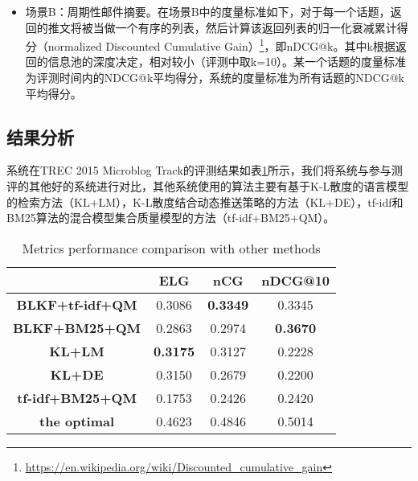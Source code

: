 \begin{itemize}
  \item 场景B：周期性邮件摘要。在场景B中的度量标准如下，对于每一个话题，返回的推文将被当做一个有序的列表，然后计算该返回列表的归一化衰减累计得分（normalized Discounted Cumulative Gain）\footnote{\url{https://en.wikipedia.org/wiki/Discounted_cumulative_gain}}，即nDCG@k。其中k根据返回的信息池的深度决定，相对较小（评测中取k=10）。某一个话题的度量标准为评测时间内的NDCG@k平均得分，系统的度量标准为所有话题的NDCG@k平均得分。
\end{itemize}

\subsection{结果分析}
\label{subsec2:res}
系统在TREC 2015 Microblog Track的评测结果如表\ref{tab:trecRes}所示，我们将系统与参与测评的其他好的系统进行对比，其他系统使用的算法主要有基于K-L散度的语言模型的检索方法（KL+LM），K-L散度结合动态推送策略的方法（KL+DE），tf-idf和BM25算法的混合模型集合质量模型的方法（tf-idf+BM25+QM）。
\begin{table}[!htbp]
  \centering
  \caption{Metrics performance comparison with other methods}
  \label{tab:trecRes}
  \begin{tabular}{cccc}
  \hline
   &ELG&nCG&nDCG@10\\
  \hline
  \textbf{BLKF+tf-idf+QM}&0.3086&\textbf{0.3349}&0.3345\\
  \hline
  \textbf{BLKF+BM25+QM}&0.2863&0.2974&\textbf{0.3670}\\
  \hline
  \textbf{KL+LM}&\textbf{0.3175}& 0.3127&0.2228\\
  \hline
  \textbf{KL+DE}&0.3150&0.2679&0.2200\\
  \hline
  \textbf{tf-idf+BM25+QM}&0.1753&0.2426&0.2420\\
  \hline
  \textbf{the optimal}&0.4623&0.4846&0.5014\\
  \hline
  \end{tabular}
\end{table}

